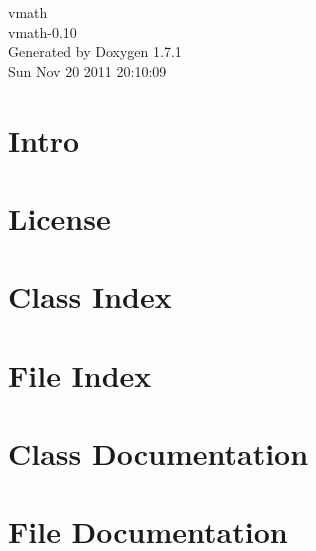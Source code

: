 \documentclass[a4paper]{book}
\begin{document}
\hypersetup{pageanchor=false}
\begin{titlepage}
\vspace*{7cm}
\begin{center}
{\Large vmath \\[1ex]\large vmath-\/0.10 }\\
\vspace*{1cm}
{\large Generated by Doxygen 1.7.1}\\
\vspace*{0.5cm}
{\small Sun Nov 20 2011 20:10:09}\\
\end{center}
\end{titlepage}
\clearemptydoublepage
{}
\tableofcontents
\clearemptydoublepage
{}
\hypersetup{pageanchor=true}
\chapter{Intro}
\label{index}\hypertarget{index}{}
\chapter{License}
\label{license}
\hypertarget{license}{}

\chapter{Class Index}

\chapter{File Index}

\chapter{Class Documentation}






\chapter{File Documentation}


\printindex
\end{document}
